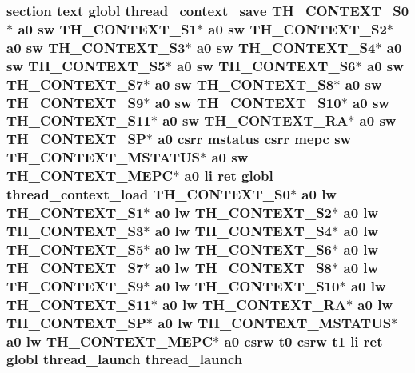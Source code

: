 \hypertarget{riscv_2threada_8S_aa85302408183fa840eaf0a73d30a5f13}{
\subsubsection[{thread\-\_\-launch}]{\setlength{\rightskip}{0pt plus 5cm}section text globl {\bf thread\-\_\-context\-\_\-save} {\bf T\-H\-\_\-\-C\-O\-N\-T\-E\-X\-T\-\_\-\-S0}$\ast$ {\bf a0} {\bf sw} {\bf T\-H\-\_\-\-C\-O\-N\-T\-E\-X\-T\-\_\-\-S1}$\ast$ {\bf a0} {\bf sw} {\bf T\-H\-\_\-\-C\-O\-N\-T\-E\-X\-T\-\_\-\-S2}$\ast$ {\bf a0} {\bf sw} {\bf T\-H\-\_\-\-C\-O\-N\-T\-E\-X\-T\-\_\-\-S3}$\ast$ {\bf a0} {\bf sw} {\bf T\-H\-\_\-\-C\-O\-N\-T\-E\-X\-T\-\_\-\-S4}$\ast$ {\bf a0} {\bf sw} {\bf T\-H\-\_\-\-C\-O\-N\-T\-E\-X\-T\-\_\-\-S5}$\ast$ {\bf a0} {\bf sw} {\bf T\-H\-\_\-\-C\-O\-N\-T\-E\-X\-T\-\_\-\-S6}$\ast$ {\bf a0} {\bf sw} {\bf T\-H\-\_\-\-C\-O\-N\-T\-E\-X\-T\-\_\-\-S7}$\ast$ {\bf a0} {\bf sw} {\bf T\-H\-\_\-\-C\-O\-N\-T\-E\-X\-T\-\_\-\-S8}$\ast$ {\bf a0} {\bf sw} {\bf T\-H\-\_\-\-C\-O\-N\-T\-E\-X\-T\-\_\-\-S9}$\ast$ {\bf a0} {\bf sw} {\bf T\-H\-\_\-\-C\-O\-N\-T\-E\-X\-T\-\_\-\-S10}$\ast$ {\bf a0} {\bf sw} {\bf T\-H\-\_\-\-C\-O\-N\-T\-E\-X\-T\-\_\-\-S11}$\ast$ {\bf a0} {\bf sw} {\bf T\-H\-\_\-\-C\-O\-N\-T\-E\-X\-T\-\_\-\-R\-A}$\ast$ {\bf a0} {\bf sw} {\bf T\-H\-\_\-\-C\-O\-N\-T\-E\-X\-T\-\_\-\-S\-P}$\ast$ {\bf a0} csrr {\bf mstatus} csrr {\bf mepc} {\bf sw} {\bf T\-H\-\_\-\-C\-O\-N\-T\-E\-X\-T\-\_\-\-M\-S\-T\-A\-T\-U\-S}$\ast$ {\bf a0} {\bf sw} {\bf T\-H\-\_\-\-C\-O\-N\-T\-E\-X\-T\-\_\-\-M\-E\-P\-C}$\ast$ {\bf a0} {\bf li} ret globl {\bf thread\-\_\-context\-\_\-load} {\bf T\-H\-\_\-\-C\-O\-N\-T\-E\-X\-T\-\_\-\-S0}$\ast$ {\bf a0} {\bf lw} {\bf T\-H\-\_\-\-C\-O\-N\-T\-E\-X\-T\-\_\-\-S1}$\ast$ {\bf a0} {\bf lw} {\bf T\-H\-\_\-\-C\-O\-N\-T\-E\-X\-T\-\_\-\-S2}$\ast$ {\bf a0} {\bf lw} {\bf T\-H\-\_\-\-C\-O\-N\-T\-E\-X\-T\-\_\-\-S3}$\ast$ {\bf a0} {\bf lw} {\bf T\-H\-\_\-\-C\-O\-N\-T\-E\-X\-T\-\_\-\-S4}$\ast$ {\bf a0} {\bf lw} {\bf T\-H\-\_\-\-C\-O\-N\-T\-E\-X\-T\-\_\-\-S5}$\ast$ {\bf a0} {\bf lw} {\bf T\-H\-\_\-\-C\-O\-N\-T\-E\-X\-T\-\_\-\-S6}$\ast$ {\bf a0} {\bf lw} {\bf T\-H\-\_\-\-C\-O\-N\-T\-E\-X\-T\-\_\-\-S7}$\ast$ {\bf a0} {\bf lw} {\bf T\-H\-\_\-\-C\-O\-N\-T\-E\-X\-T\-\_\-\-S8}$\ast$ {\bf a0} {\bf lw} {\bf T\-H\-\_\-\-C\-O\-N\-T\-E\-X\-T\-\_\-\-S9}$\ast$ {\bf a0} {\bf lw} {\bf T\-H\-\_\-\-C\-O\-N\-T\-E\-X\-T\-\_\-\-S10}$\ast$ {\bf a0} {\bf lw} {\bf T\-H\-\_\-\-C\-O\-N\-T\-E\-X\-T\-\_\-\-S11}$\ast$ {\bf a0} {\bf lw} {\bf T\-H\-\_\-\-C\-O\-N\-T\-E\-X\-T\-\_\-\-R\-A}$\ast$ {\bf a0} {\bf lw} {\bf T\-H\-\_\-\-C\-O\-N\-T\-E\-X\-T\-\_\-\-S\-P}$\ast$ {\bf a0} {\bf lw} {\bf T\-H\-\_\-\-C\-O\-N\-T\-E\-X\-T\-\_\-\-M\-S\-T\-A\-T\-U\-S}$\ast$ {\bf a0} {\bf lw} {\bf T\-H\-\_\-\-C\-O\-N\-T\-E\-X\-T\-\_\-\-M\-E\-P\-C}$\ast$ {\bf a0} csrw {\bf t0} csrw {\bf t1} {\bf li} ret globl thread\-\_\-launch thread\-\_\-launch}}\label{riscv_2threada_8S_aa85302408183fa840eaf0a73d30a5f13}
